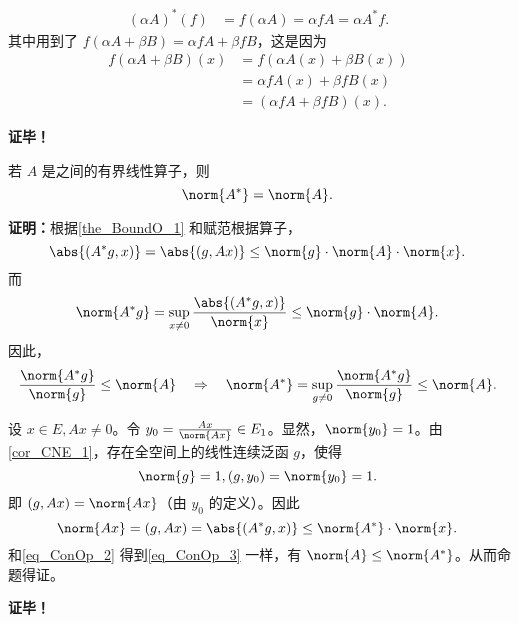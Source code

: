 \begin{equation}
\begin{aligned}
(\alpha A)^*(f)&=f(\alpha A)=\alpha fA=\alpha A^*f.
\end{aligned}~
\end{equation}
其中用到了 $f(\alpha A+\beta B)=\alpha fA+\beta fB$，这是因为
\begin{equation}
\begin{aligned}
f(\alpha A+\beta B)(x)&=f(\alpha A(x)+\beta B(x))\\
&=\alpha fA(x)+\beta fB(x)\\
&=(\alpha fA+\beta fB)(x).
\end{aligned}~
\end{equation}

\textbf{证毕！}



\begin{theorem}{}
若 $A$ 是之间的有界线性算子，则
\begin{equation}
\norm{A^*}=\norm{A}.~
\end{equation}

\end{theorem}

\textbf{证明：}根据\autoref{the_BoundO_1} 和赋范根据算子，
\begin{equation}\label{eq_ConOp_2}
\abs{(A^*g,x)}=\abs{(g,Ax)}\leq\norm{g}\cdot\norm{A}\cdot\norm{x}.~
\end{equation}
而 
\begin{equation}
\norm{A^*g}=\sup_{x\neq0} \frac{\abs{(A^*g,x)}}{\norm{x}}\leq\norm{g}\cdot\norm{A}.~
\end{equation}
因此，
\begin{equation}\label{eq_ConOp_3}
\frac{\norm{A^*g}}{\norm{g}}\leq\norm{A}\quad\Rightarrow\quad \norm{A^*}=\sup_{g\neq0}\frac{\norm{A^*g}}{\norm{g}}\leq\norm{A}.~
\end{equation}

设 $x\in E,Ax\neq0$。令 $y_0=\frac{Ax}{\norm{Ax}}\in E_1$。显然，$\norm{y_0}=1$。由\autoref{cor_CNE_1}，存在全空间上的线性连续泛函 $g$，使得 
\begin{equation}
\norm{g}=1,(g,y_0)=\norm{y_0}=1.~
\end{equation}
即 $(g,Ax)=\norm{Ax}$（由 $y_0$ 的定义）。因此
\begin{equation}
\norm{Ax}=(g,Ax)=\abs{(A^*g,x)}\leq\norm{A^*}\cdot\norm{x}.~
\end{equation}
和\autoref{eq_ConOp_2} 得到\autoref{eq_ConOp_3} 一样，有 $\norm{A}\leq\norm{A^*}$。从而命题得证。

\textbf{证毕！}


